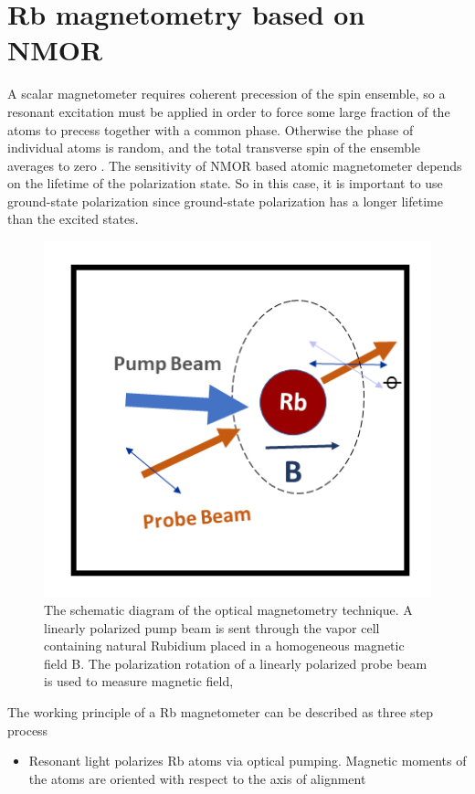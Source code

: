 \section{Rb magnetometry based on NMOR}

A scalar magnetometer requires coherent precession of the spin ensemble, so a resonant excitation must be applied in order to force some large fraction of the atoms to precess together with a common phase. Otherwise the phase of individual atoms is random, and the total transverse spin of the ensemble averages to zero . The sensitivity of NMOR based atomic magnetometer depends on the lifetime of the polarization state. So in this case, it is important to use ground-state polarization since ground-state polarization has a longer lifetime than the excited states. 
\begin{figure}[h]
\centering
\includegraphics[width=0.55\linewidth]{figures/optical_pumping}
\caption{The schematic diagram of the optical magnetometry technique.
  A linearly polarized pump beam is sent through the vapor cell
  containing natural Rubidium placed in a homogeneous magnetic field
  B.  The polarization rotation of a linearly polarized probe beam is
  used to measure magnetic field,\label{Rb magnetometry}}
\end{figure}
The working principle of a Rb magnetometer can be described as three step process
\begin{itemize}
\item
Resonant light polarizes Rb atoms via optical pumping. Magnetic
moments of the atoms are oriented with respect to the axis of
alignment
\end{itemize}
